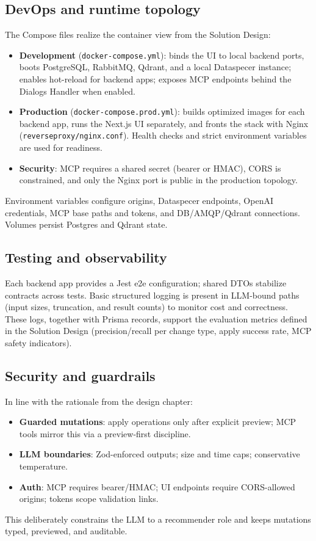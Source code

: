 \subsection{DevOps and runtime topology}
The Compose files realize the container view from the Solution Design:
\begin{itemize}
  \item \textbf{Development} (\texttt{docker-compose.yml}): binds the UI to local backend ports, boots PostgreSQL, RabbitMQ, Qdrant, and a local Dataspecer instance; enables hot-reload for backend apps; exposes MCP endpoints behind the Dialogs Handler when enabled.
  \item \textbf{Production} (\texttt{docker-compose.prod.yml}): builds optimized images for each backend app, runs the Next.js UI separately, and fronts the stack with Nginx (\texttt{reverseproxy/nginx.conf}). Health checks and strict environment variables are used for readiness.
  \item \textbf{Security}: MCP requires a shared secret (bearer or HMAC), CORS is constrained, and only the Nginx port is public in the production topology.
\end{itemize}
Environment variables configure origins, Dataspecer endpoints, OpenAI credentials, MCP base paths and tokens, and DB/AMQP/Qdrant connections. Volumes persist Postgres and Qdrant state.

\subsection{Testing and observability}
Each backend app provides a Jest e2e configuration; shared DTOs stabilize contracts across tests. Basic structured logging is present in LLM-bound paths (input sizes, truncation, and result counts) to monitor cost and correctness. These logs, together with Prisma records, support the evaluation metrics defined in the Solution Design (precision/recall per change type, apply success rate, MCP safety indicators).

\subsection{Security and guardrails}
In line with the rationale from the design chapter:
\begin{itemize}
  \item \textbf{Guarded mutations}: apply operations only after explicit preview; MCP tools mirror this via a preview-first discipline.
  \item \textbf{LLM boundaries}: Zod-enforced outputs; size and time caps; conservative temperature.
  \item \textbf{Auth}: MCP requires bearer/HMAC; UI endpoints require CORS-allowed origins; tokens scope validation links.
\end{itemize}
This deliberately constrains the LLM to a recommender role and keeps mutations typed, previewed, and auditable.

